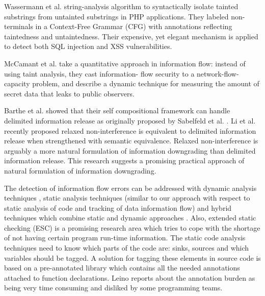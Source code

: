 Wassermann et al. \cite{ref_102_minamide2005static} string-analysis algorithm to syntactically isolate tainted substrings from untainted
substrings in PHP applications. They labeled non-terminals in a
Context-Free Grammar (CFG) with annotations reflecting taintedness
and untaintedness. Their expensive, yet elegant mechanism
is applied to detect both SQL injection and XSS vulnerabilities.

McCamant et al. \cite{ref_101_mccamant2008quantitative} take a quantitative approach in information
flow: instead of using taint analysis, they cast information-
flow security to a network-flow-capacity problem, and describe a
dynamic technique for measuring the amount of secret data that
leaks to public observers.

Barthe et al. \cite{ref_71_barthe2004secure} showed that their self compositional framework can handle delimited information release as originally proposed by Sabelfeld et al. \cite{ref_72_sabelfeld2004model}. Li et al.
recently proposed relaxed non-interference \cite{ref_73_li2005downgrading} is equivalent to delimited information release when strengthened with semantic equivalence. Relaxed non-interference is arguably a more natural formulation of information downgrading than delimited
information release. This research suggests a promising practical approach of natural formulation of information downgrading.


The detection of information flow errors can be
addressed with dynamic analysis techniques \cite{ref_44_avgerinos:aeg,ref_43_fenton:memoryless,ref_42_sabelfeld:dynamic},
static analysis techniques \cite{ref_41_guarnieri:security,ref_40_myers:jflow,ref_38_volpano:sound,ref_37_xiao:transparent} (similar
to our approach with respect to static analysis of code and
tracking of data information flow) and hybrid techniques which
combine static and dynamic approaches \cite{ref_36_moore:static}. Also, extended
static checking \cite{ref_35_david:extended} (ESC) is a promising research area which
tries to cope with the shortage of not having certain program
run-time information.
The static code analysis techniques need to know which
parts of the code are: sinks, sources and which variables
should be tagged. A solution for tagging these elements in
source code is based on a pre-annotated library which contains
all the needed annotations attached to function declarations.
Leino \cite{ref_34_leino:10years} reports about the annotation burden as being very
time consuming and disliked by some programming teams.

